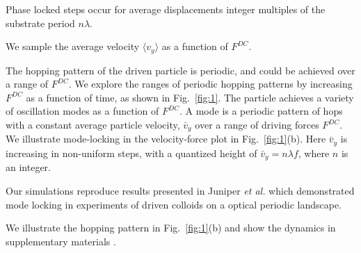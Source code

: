 \documentclass[twocolumn,preprintnumbers,amsmath,amssymb,aps,prx]{revtex4}
\begin{document}
Phase locked steps occur for average displacements integer
multiples of the substrate period $n\lambda$.

We sample the average velocity $\langle v_y \rangle $
as a function of $F^{DC}$.

The hopping pattern of the driven particle is periodic,
and could be achieved over a range of $F^{DC}$.  %
We explore the ranges of periodic hopping patterns
by increasing $F^{DC}$ as a function of time,
as shown in 
%
Fig.~\ref{fig:1}.
The particle 
achieves a variety of oscillation modes as a function of $F^{DC}$.
A mode is a periodic pattern of hops
with a constant average particle velocity, $\bar{v}_{y}$
over a range of driving forces $F^{DC}$.
We illustrate mode-locking in 
the velocity-force plot in Fig.~\ref{fig:1}(b).
Here $\bar{v}_{y}$ is increasing in non-uniform steps,
with a quantized height of
$\bar{v}_{y} = n \lambda f$,
where $n$ is an integer.  

Our simulations reproduce results presented in 
Juniper {\it et al.} \cite{Juniper2015, Juniper2018}
which demonstrated
mode locking in
experiments of 
driven colloids on a
optical periodic landscape.

We illustrate the hopping pattern in Fig.~\ref{fig:1}(b)
and 
show the dynamics 
in supplementary materials \cite{supp1}.
\end{document}
